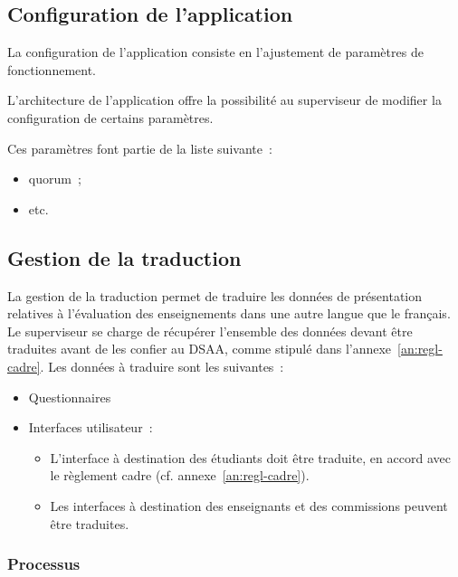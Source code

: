 \documentclass[a4paper,11pt]{report}
\begin{document}
\subsection{Configuration de l'application}
La configuration de l'application consiste en l'ajustement de paramètres de fonctionnement.

L'architecture de l'application offre la possibilité au superviseur de modifier la configuration de certains paramètres.

\noindent Ces paramètres font partie de la liste suivante~:
\begin{itemize}
	\item quorum~;
	\item etc.
\end{itemize}





\subsection{Gestion de la traduction}
La gestion de la traduction permet de traduire les données de présentation relatives à l'évaluation des enseignements dans une autre langue que le français.
Le superviseur se charge de récupérer l'ensemble des données devant être traduites avant de les confier au DSAA, comme stipulé dans l'annexe~\ref{an:regl-cadre}.
Les données à traduire sont les suivantes~:
\begin{itemize}
	\item Questionnaires
	\item Interfaces utilisateur~:
	\begin{itemize}
		\item L'interface à destination des étudiants doit être traduite, en accord avec le règlement cadre (cf. annexe~\ref{an:regl-cadre}).
		\item Les interfaces à destination des enseignants et des commissions peuvent être traduites.
	\end{itemize}
\end{itemize}

\subsubsection{Processus}
\end{document}
